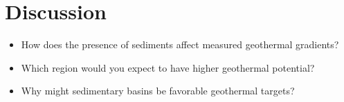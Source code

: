 \documentclass[11pt,a4paper]{article}
\begin{document}
\section*{Discussion}
\begin{itemize}
  \item How does the presence of sediments affect measured geothermal gradients?
  \item Which region would you expect to have higher geothermal potential?
  \item Why might sedimentary basins be favorable geothermal targets?
\end{itemize}
\end{document}
